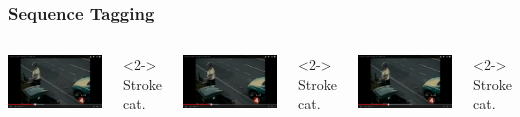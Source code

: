 \documentclass[final,ignorenonframetext,compress]{beamer}
\begin{document}
\begin{frame}
    \frametitle{Sequence Tagging}
    \begin{columns}[t]
        \includegraphics[width=\linewidth]{images/stroke1}\\
        \begin{visibleenv}<2->
            \tiny{Stroke cat.}
        \end{visibleenv}

        \includegraphics[width=\linewidth]{images/stroke2}\\
        \begin{visibleenv}<2->
        \tiny Stroke cat.
        \end{visibleenv}

        \includegraphics[width=\linewidth]{images/stroke3}\\
        \begin{visibleenv}<2->
        \tiny Stroke cat.
        \end{visibleenv}


\end{columns}
\end{frame}
\end{document}
